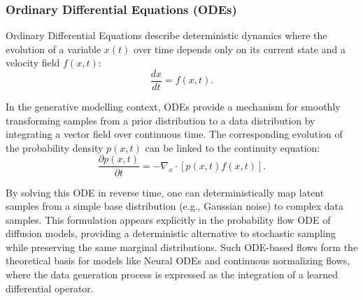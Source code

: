 \subsubsection{Ordinary Differential Equations (ODEs)}

Ordinary Differential Equations describe deterministic dynamics where the evolution of a variable \( x(t) \) over time depends only on its current state and a velocity field \( f(x, t) \):
\begin{equation}
    \frac{dx}{dt} = f(x, t).
\end{equation}

In the generative modelling context, ODEs provide a mechanism for smoothly transforming samples from a prior distribution to a data distribution by integrating a vector field over continuous time. The corresponding evolution of the probability density \( p(x, t) \) can be linked to the continuity equation:
\begin{equation}
    \frac{\partial p(x, t)}{\partial t} = -\nabla_x \cdot [p(x, t) f(x, t)].
\end{equation}

By solving this ODE in reverse time, one can deterministically map latent samples from a simple base distribution (e.g., Gaussian noise) to complex data samples. This formulation appears explicitly in the probability flow ODE of diffusion models, providing a deterministic alternative to stochastic sampling while preserving the same marginal distributions. Such ODE-based flows form the theoretical basis for models like Neural ODEs and continuous normalizing flows, where the data generation process is expressed as the integration of a learned differential operator.
